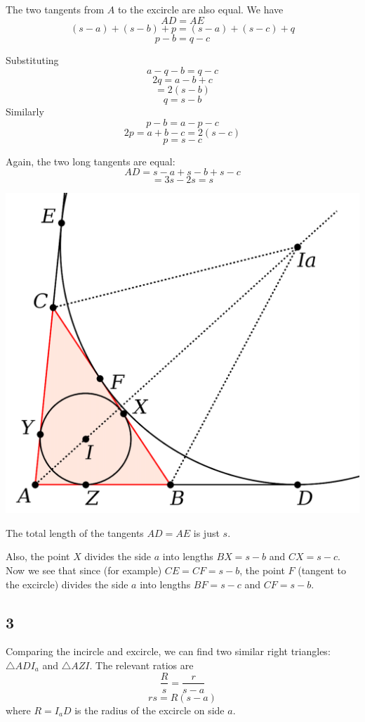 \documentclass[11pt, oneside]{article}
\begin{document}
The two tangents from $A$ to the excircle are also equal.  We have
\[ AD = AE \] 
\[ (s-a) + (s-b) + p = (s-a) + (s-c) + q \]
\[ p - b = q - c \]

Substituting
\[ a - q - b = q - c \]
\[ 2q = a - b + c \]
\[    = 2(s - b) \]
\[ q = s-b \]
Similarly
\[ p - b = a - p - c \]
\[ 2p = a + b - c = 2(s-c) \]
\[ p = s-c \]

Again, the two long tangents are equal:
\[ AD = s - a + s - b + s - c \]
\[ = 3s - 2s = s \]

\begin{center} \includegraphics [scale=0.40] {excircle_crop1.png} \end{center}

The total length of the tangents $AD = AE$ is just $s$.

Also, the point $X$ divides the side $a$ into lengths $BX = s-b$ and $CX = s-c$.  Now we see that since (for example) $CE = CF = s-b$, the point $F$ (tangent to the excircle) divides the side $a$ into lengths $BF = s-c$ and $CF = s-b$.

\subsection*{3}

Comparing the incircle and excircle, we can find two similar right triangles:  $\triangle ADI_a$ and $\triangle AZI$.  The relevant ratios are
\[ \frac{R}{s} = \frac{r}{s-a} \]
\[ rs = R(s-a) \]
where $R = I_a D$ is the radius of the excircle on side $a$.
\end{document}
